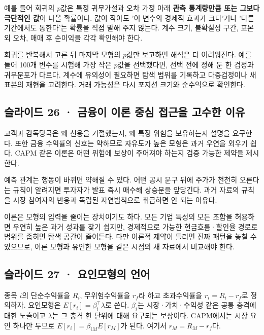\documentclass[11pt,a4paper]{article}
\begin{document}
예를 들어 회귀의 $p$값은 특정 귀무가설과 오차 가정 아래 \textbf{관측 통계량만큼 또는 그보다 극단적인 값}이 나올 확률이다. 값이 작아도 '이 변수의 경제적 효과가 크다'거나 '다른 기간에서도 통한다'는 확률을 직접 말해 주지 않는다. 계수 크기, 불확실성 구간, 표본외 오차, 매매 후 순이익을 각각 확인해야 한다.\par

회귀를 반복해서 고른 뒤 마지막 모형의 $p$값만 보고하면 해석은 더 어려워진다. 예를 들어 100개 변수를 시험해 가장 작은 $p$값을 선택했다면, 선택 전에 정해 둔 한 검정과 귀무분포가 다르다. 계수에 유의성이 필요하면 탐색 범위를 기록하고 다중검정이나 새 표본의 재현을 고려한다. 거래 가능성은 다시 포지션 크기와 순수익으로 확인한다.\par

\subsection{슬라이드 26 · 금융이 이론 중심 접근을 고수한 이유}
고객과 감독당국은 왜 신용을 거절했는지, 왜 특정 위험을 보유하는지 설명을 요구한다. 또한 금융 수익률의 신호는 약하므로 자유도가 높은 모형은 과거 우연을 외우기 쉽다. CAPM 같은 이론은 어떤 위험에 보상이 주어져야 하는지 검증 가능한 제약을 제시한다.\par

예측 관계는 행동이 바뀌면 약해질 수 있다. 어떤 공시 문구 뒤에 주가가 천천히 오른다는 규칙이 알려지면 투자자가 발표 즉시 매수해 상승분을 앞당긴다. 과거 자료의 규칙을 시장 참여자의 반응과 독립된 자연법칙으로 취급하면 안 되는 이유다.\par

이론은 모형의 입력을 줄이는 장치이기도 하다. 모든 기업 특성의 모든 조합을 허용하면 우연히 높은 과거 성과를 찾기 쉽지만, 경제적으로 가능한 현금흐름·할인율 경로로 범위를 좁히면 탐색 공간이 줄어든다. 다만 이론적 제약이 틀리면 진짜 패턴을 놓칠 수 있으므로, 이론 모형과 유연한 모형을 같은 시점의 새 자료에서 비교해야 한다.\par

\subsection{슬라이드 27 · 요인모형의 언어}
종목 $i$의 단순수익률을 $R_i$, 무위험수익률을 $r_f$라 하고 초과수익률을 $r_i=R_i-r_f$로 정의하자. 요인모형은 $E[r_i]=\beta_i^\top\lambda$로 쓴다. $\beta_i$는 시장·가치·수익성 같은 공통 충격에 대한 노출이고 $\lambda$는 그 충격 한 단위에 대해 요구되는 보상이다. CAPM에서는 시장 요인 하나만 두므로 $E[r_i]=\beta_{iM}E[r_M]$가 된다. 여기서 $r_M=R_M-r_f$다.\par
\end{document}
